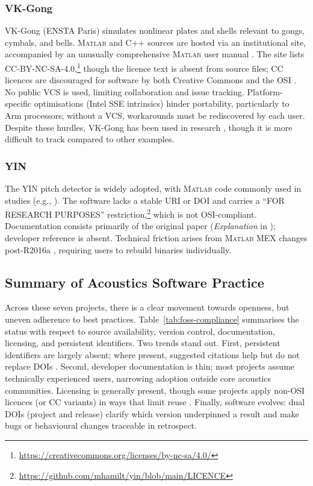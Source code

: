 \subsubsection{VK-Gong}

VK-Gong (ENSTA Paris) simulates nonlinear plates and shells relevant to gongs,
cymbals, and bells. M\textsc{atlab} and C\textsc{++} sources are hosted via an
institutional site, accompanied by an unusually comprehensive M\textsc{atlab}
user manual \cite{vkgong_manual_2017}. The site lists
CC-BY-NC-SA-4.0,\footnote{\url{https://creativecommons.org/licenses/by-nc-sa/4.0/}}
though the licence text is absent from source files; CC licences are discouraged
for software by both Creative Commons and the OSI \cite{cc_can_2025}. No public
VCS is used, limiting collaboration and issue tracking. Platform-specific
optimisations (Intel SSE intrinsics) hinder portability, particularly to Arm
processors; without a VCS, workarounds must be rediscovered by each user.
Despite these hurdles, VK-Gong has been used in research
\cite{nguyen_nonlinear_2019}, though it is more difficult to track compared to
other examples.

\subsubsection{YIN}

The YIN pitch detector \cite{cheveigne_yin_2002} is widely adopted, with
M\textsc{atlab} code commonly used in studies (e.g.,
\textcite{bowen_assessing_2019}). The software lacks a stable URI or DOI and
carries a ``FOR RESEARCH PURPOSES''
restriction,\footnote{\url{https://github.com/mhamilt/yin/blob/main/LICENCE}}
which is not OSI-compliant. Documentation consists primarily of the original
paper (\emph{Explanation} in \textcite{procida_diataxis_2025}); developer
reference is absent. Technical friction arises from M\textsc{atlab} MEX changes
post-R2016a \cite{matlab_mex_2025}, requiring users to rebuild binaries
individually.

\subsection{Summary of Acoustics Software Practice}

Across these seven projects, there is a clear movement towards openness, but
uneven adherence to best practices. Table~\ref{tab:foss-compliance} summarises
the status with respect to source availability, version control, documentation,
licensing, and persistent identifiers. Two trends stand out. First, persistent
identifiers are largely absent; where present, suggested citations help but do
not replace DOIs \cite{hornikx_exploring_2024}. Second, developer documentation
is thin; most projects assume technically experienced users, narrowing adoption
outside core acoustics communities. Licensing is generally present, though some
projects apply non-OSI licences (or CC variants) in ways that limit reuse
\cite{cc_can_2025, hong_choosing_2025}. Finally, software evolves: dual DOIs
(project and release) clarify which version underpinned a result and make bugs
or behavioural changes traceable in retrospect.

